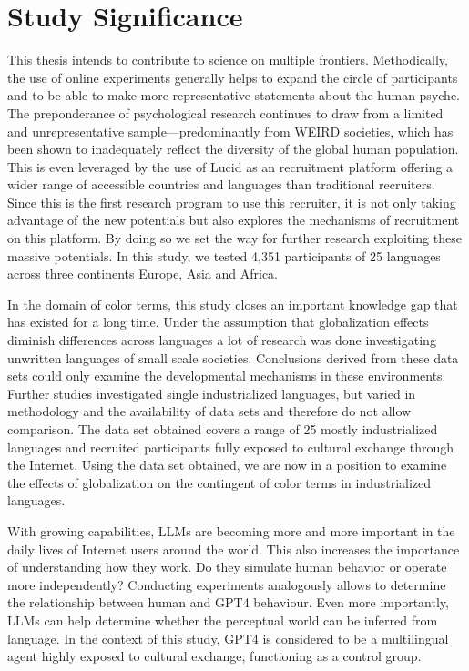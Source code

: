 \section{Study Significance}

This thesis intends to contribute to science on multiple frontiers. Methodically, the use of online experiments generally helps to expand the circle of participants and to be able to make more representative statements about the human psyche. 
The preponderance of psychological research continues to draw from a limited and unrepresentative sample—predominantly from WEIRD societies, which has been shown to inadequately reflect the diversity of the global human population.
This is even leveraged by the use of Lucid as an recruitment platform offering a wider range of accessible countries and languages than traditional recruiters. Since this is the first research program to use this recruiter, it is not only taking advantage of the new potentials but also explores the mechanisms of recruitment on this platform. By doing so we set the way for further research exploiting these massive potentials.
In this study, we tested 4,351 participants of 25 languages across three continents Europe, Asia and Africa.

In the domain of color terms, this study closes an important knowledge gap that has existed for a long time. 
Under the assumption that globalization effects diminish differences across languages a lot of research was done investigating unwritten languages of small scale societies.
Conclusions derived from these data sets could only examine the developmental mechanisms in these environments.
Further studies investigated single industrialized languages, but varied in methodology and the availability of data sets and therefore do not allow comparison.
The data set obtained covers a range of 25 mostly industrialized languages and recruited participants fully exposed to cultural exchange through the Internet.
Using the data set obtained, we are now in a position to examine the effects of globalization on the contingent of color terms in industrialized languages.

With growing capabilities, LLMs are becoming more and more important in the daily lives of Internet users around the world. This also increases the importance of understanding how they work. Do they simulate human behavior or operate more independently?
Conducting experiments analogously allows to determine the relationship between human and GPT4 behaviour. Even more importantly, LLMs can help determine whether the perceptual world can be inferred from language.
In the context of this study, GPT4 is considered to be a multilingual agent highly exposed to cultural exchange, functioning as a control group.
